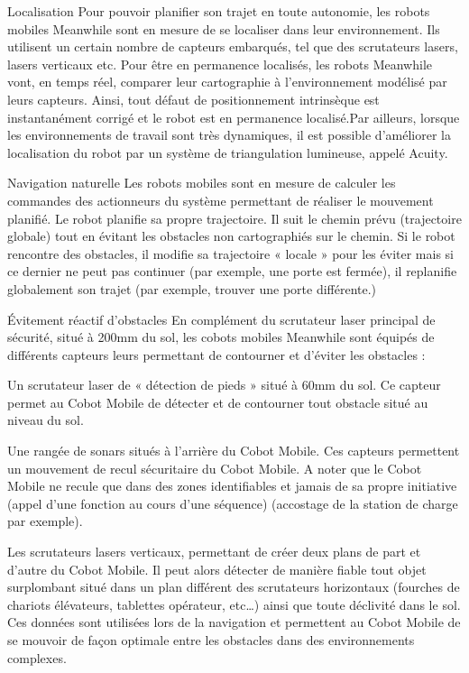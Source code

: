 Localisation
Pour pouvoir planifier son trajet en toute autonomie, les robots mobiles Meanwhile sont en mesure de se localiser dans leur environnement. Ils utilisent un certain nombre de capteurs embarqués, tel que des scrutateurs lasers, lasers verticaux etc. Pour être en permanence localisés, les robots Meanwhile vont, en temps réel, comparer leur cartographie à l’environnement modélisé par leurs capteurs. Ainsi, tout défaut de positionnement intrinsèque est instantanément corrigé et le robot est en permanence localisé.Par ailleurs, lorsque les environnements de travail sont très dynamiques, il est possible d’améliorer la localisation du robot par un système de triangulation lumineuse, appelé Acuity.

Navigation naturelle 
Les robots mobiles sont en mesure de calculer les commandes des actionneurs du système permettant de réaliser le mouvement planifié. Le robot planifie sa propre trajectoire. Il suit le chemin prévu (trajectoire globale) tout en évitant les obstacles non cartographiés sur le chemin. Si le robot rencontre des obstacles, il modifie sa trajectoire « locale » pour les éviter mais si ce dernier ne peut pas continuer (par exemple, une porte est fermée), il replanifie globalement son trajet (par exemple, trouver une porte différente.)

Évitement réactif d’obstacles 
En complément du scrutateur laser principal de sécurité, situé à 200mm du sol, les cobots mobiles Meanwhile sont équipés de différents capteurs leurs permettant de contourner et d’éviter les obstacles :

Un scrutateur laser de « détection de pieds » situé à 60mm du sol. Ce capteur permet au Cobot Mobile de détecter et de contourner tout obstacle situé au niveau du sol.

Une rangée de sonars situés à l’arrière du Cobot Mobile. Ces capteurs permettent un mouvement de recul sécuritaire du Cobot Mobile. A noter que le Cobot Mobile ne recule que dans des zones identifiables et jamais de sa propre initiative (appel d’une fonction au cours d’une séquence) (accostage de la station de charge par exemple).

Les scrutateurs lasers verticaux, permettant de créer deux plans de part et d’autre du Cobot Mobile. Il peut alors détecter de manière fiable tout objet surplombant situé dans un plan différent des scrutateurs horizontaux (fourches de chariots élévateurs, tablettes opérateur, etc…) ainsi que toute déclivité dans le sol. Ces données sont utilisées lors de la navigation et permettent au Cobot Mobile de se mouvoir de façon optimale entre les obstacles dans des environnements complexes.

